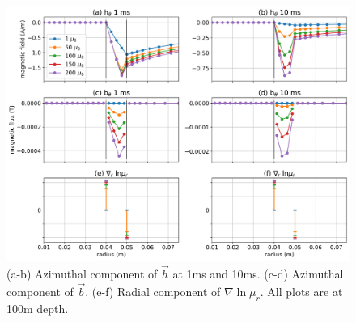 \begin{figure}
    \begin{center}
    \includegraphics[width=\textwidth]{figures/magnetization-term.png}
    \end{center}
\caption{
    (a-b) Azimuthal component of $\vec{h}$ at 1ms and 10ms. (c-d) Azimuthal component of $\vec{b}$. (e-f) Radial component of $\nabla \ln \mu_r$. All plots are at 100m depth.
}
\label{fig:magnetization-term}
\end{figure}



